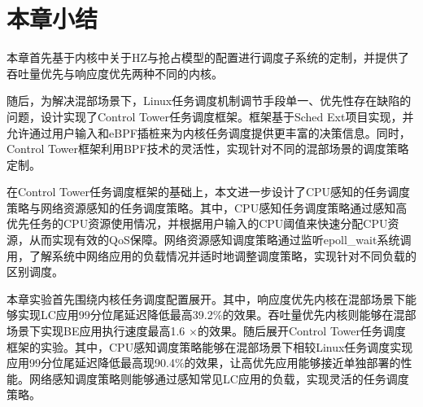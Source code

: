 \section{本章小结}

本章首先基于内核中关于HZ与抢占模型的配置进行调度子系统的定制，并提供了吞吐量优先与响应度优先两种不同的内核。

随后，为解决混部场景下，Linux任务调度机制调节手段单一、优先性存在缺陷的问题，设计实现了Control Tower任务调度框架。框架基于Sched Ext项目实现，并允许通过用户输入和eBPF插桩来为内核任务调度提供更丰富的决策信息。同时，Control Tower框架利用BPF技术的灵活性，实现针对不同的混部场景的调度策略定制。

在Control Tower任务调度框架的基础上，本文进一步设计了CPU感知的任务调度策略与网络资源感知的任务调度策略。其中，CPU感知任务调度策略通过感知高优先任务的CPU资源使用情况，并根据用户输入的CPU阈值来快速分配CPU资源，从而实现有效的QoS保障。网络资源感知调度策略通过监听epoll\_wait系统调用，了解系统中网络应用的负载情况并适时地调整调度策略，实现针对不同负载的区别调度。

本章实验首先围绕内核任务调度配置展开。其中，响应度优先内核在混部场景下能够实现LC应用99分位尾延迟降低最高39.2\%的效果。吞吐量优先内核则能够在混部场景下实现BE应用执行速度最高1.6 $\times$的效果。随后展开Control Tower任务调度框架的实验。其中，CPU感知调度策略能够在混部场景下相较Linux任务调度实现应用99分位尾延迟降低最高现90.4\%的效果，让高优先应用能够接近单独部署的性能。网络感知调度策略则能够通过感知常见LC应用的负载，实现灵活的任务调度策略。